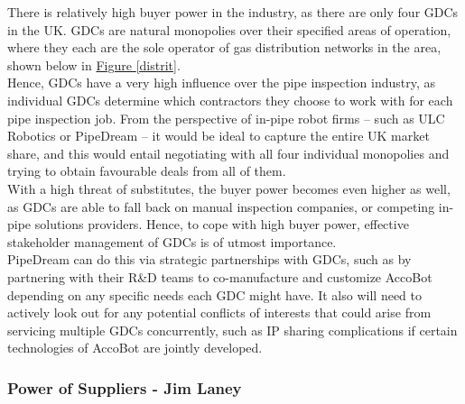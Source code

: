 \documentclass[11pt]{article}		%
\newcommand{\figref}[1]{\hyperref[#1]{Figure \ref*{#1}}}    %
\begin{document}
			There is relatively high buyer power in the industry, as there are only four GDCs in the UK. GDCs are natural monopolies over their specified areas of operation, where they each are the sole operator of gas distribution networks in the area, shown below in \figref{distrit}.
            \\\hspace*{3ex}Hence, GDCs have a very high influence over the pipe inspection industry, as individual GDCs determine which contractors they choose to work with for each pipe inspection job. From the perspective of in-pipe robot firms – such as ULC Robotics or PipeDream – it would be ideal to capture the entire UK market share, and this would entail negotiating with all four individual monopolies and trying to obtain favourable deals from all of them. 
            \\\hspace*{3ex}With a high threat of substitutes, the buyer power becomes even higher as well, as GDCs are able to fall back on manual inspection companies, or competing in-pipe solutions providers. Hence, to cope with high buyer power, effective stakeholder management of GDCs is of utmost importance.
            \\\hspace*{3ex}PipeDream can do this via strategic  partnerships with GDCs, such as by partnering with their R\&D teams to co-manufacture and customize AccoBot depending on any specific needs each GDC might have. It also will need to actively look out for any potential conflicts of interests that could arise from servicing multiple GDCs concurrently, such as IP sharing complications if certain technologies of AccoBot are jointly developed. 

			\subsubsection{Power of Suppliers - Jim Laney}
				
\end{document}
